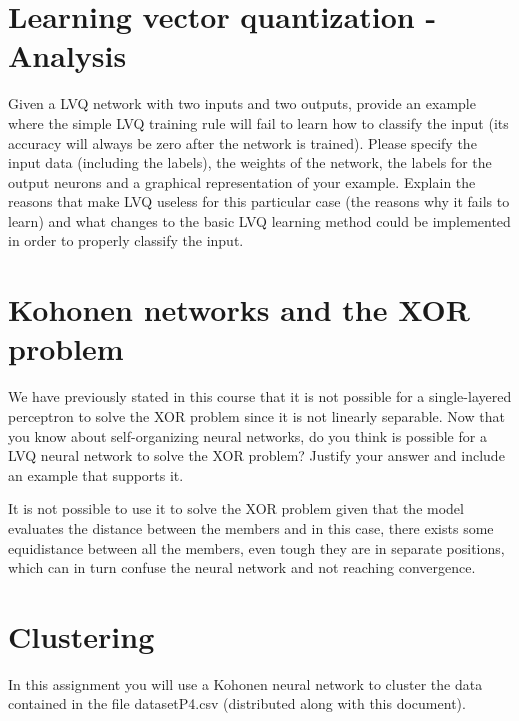 \documentclass{article}
\begin{document}
\section{Learning vector quantization - Analysis}
Given a LVQ network with two inputs and two outputs, provide an example where the simple LVQ training rule will fail to learn how to classify the input (its accuracy will always be zero after the network is trained). Please specify the input data (including the labels), the weights of the network, the labels for the output neurons and a graphical representation of your example. Explain the reasons that make LVQ useless for this particular case (the reasons why it fails to learn) and what changes to the basic LVQ learning method could be implemented in order to properly classify the input.



\section{Kohonen networks and the XOR problem}
We have previously stated in this course that it is not possible for a single-layered perceptron to solve the XOR problem since it is not linearly separable. Now that you know about self-organizing neural networks, do you think is possible for a LVQ neural network to solve the XOR problem? Justify your answer and include an example that supports it.

It is not possible to use it to solve the XOR problem given that the model evaluates the distance between the members and in this case, there exists some equidistance between all the members, even tough they are in separate positions, which can in turn confuse the neural network and not reaching convergence.

\pagebreak
\section{Clustering}
In this assignment you will use a Kohonen neural network to cluster the data contained in the file datasetP4.csv (distributed along with this document).
\end{document}
